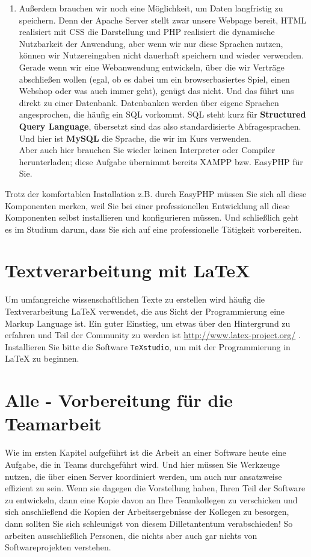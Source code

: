 \begin{enumerate}
	\item Außerdem brauchen wir noch eine Möglichkeit, um Daten langfristig zu speichern. Denn der Apache Server stellt zwar unsere Webpage bereit, HTML realisiert mit CSS die Darstellung und PHP realisiert die dynamische Nutzbarkeit der Anwendung, aber wenn wir nur diese Sprachen nutzen, können wir Nutzereingaben nicht dauerhaft speichern und wieder verwenden.\\
	Gerade wenn wir eine Webanwendung entwickeln, über die wir Verträge abschließen wollen (egal, ob es dabei um ein browserbasiertes Spiel, einen Webshop oder was auch immer geht), genügt das nicht. Und das führt uns direkt zu einer Datenbank. Datenbanken werden über eigene Sprachen angesprochen, die häufig ein SQL vorkommt. SQL steht kurz für \textbf{Structured Query Language}, übersetzt sind das also standardisierte Abfragesprachen. Und hier ist \textbf{MySQL} die Sprache, die wir im Kurs verwenden.\\
	Aber auch hier brauchen Sie wieder keinen Interpreter oder Compiler herunterladen; diese Aufgabe übernimmt bereits XAMPP bzw. EasyPHP für Sie.
\end{enumerate}

Trotz der komfortablen Installation z.B. durch EasyPHP müssen Sie sich all diese Komponenten merken, weil Sie bei einer professionellen Entwicklung all diese Komponenten selbst installieren und konfigurieren müssen. Und schließlich geht es im Studium darum, dass Sie sich auf eine professionelle Tätigkeit vorbereiten.

\section{Textverarbeitung mit LaTeX}

Um umfangreiche wissenschaftlichen Texte zu erstellen wird häufig die Textverarbeitung LaTeX verwendet, die aus Sicht der Programmierung eine Markup Language ist. Ein guter Einstieg, um etwas über den Hintergrund zu erfahren und Teil der Community zu werden ist \url{http://www.latex-project.org/} . Installieren Sie bitte die Software \verb|TeXstudio|, um mit der Programmierung in LaTeX zu beginnen.

\section{Alle - Vorbereitung für die Teamarbeit}

Wie im ersten Kapitel aufgeführt ist die Arbeit an einer Software heute eine Aufgabe, die in Teams durchgeführt wird. Und hier müssen Sie Werkzeuge nutzen, die über einen Server koordiniert werden, um auch nur ansatzweise effizient zu sein. Wenn sie dagegen die Vorstellung haben, Ihren Teil der Software zu entwickeln, dann eine Kopie davon an Ihre Teamkollegen zu verschicken und sich anschließend die Kopien der Arbeitsergebnisse der Kollegen zu besorgen, dann sollten Sie sich schleunigst von diesem Dilletantentum verabschieden! So arbeiten ausschließlich Personen, die nichts aber auch gar nichts von Softwareprojekten verstehen.\\


